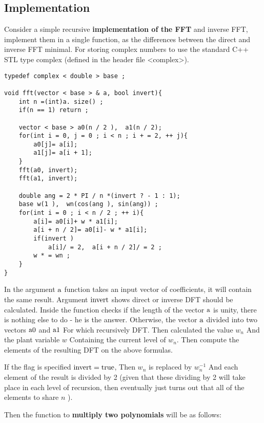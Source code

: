 \subsection{ Implementation }

Consider a simple recursive \textbf{implementation of the FFT} and inverse FFT, implement them in a single function, as the differences between the direct and inverse FFT minimal. For storing complex numbers to use the standard C++ STL type complex (defined in the header file <complex>).

\begin{verbatim}
typedef complex < double > base ;
 
void fft(vector < base > & a, bool invert){
    int n =(int)a. size() ;
    if(n == 1) return ;
 
    vector < base > a0(n / 2 ),  a1(n / 2);
    for(int i = 0, j = 0 ; i < n ; i + = 2, ++ j){
        a0[j]= a[i];
        a1[j]= a[i + 1];
    }
    fft(a0, invert);
    fft(a1, invert);
 
    double ang = 2 * PI / n *(invert ? - 1 : 1);
    base w(1 ),  wn(cos(ang ), sin(ang)) ;
    for(int i = 0 ; i < n / 2 ; ++ i){
        a[i]= a0[i]+ w * a1[i];
        a[i + n / 2]= a0[i]- w * a1[i];
        if(invert )
            a[i]/ = 2,  a[i + n / 2]/ = 2 ;
        w * = wn ;
    }
} 
\end{verbatim}
In the argument $\rm a$ function takes an input vector of coefficients, it will contain the same result. Argument $\rm invert$ shows direct or inverse DFT should be calculated. Inside the function checks if the length of the vector $\rm a$ is unity, there is nothing else to do - he is the answer. Otherwise, the vector $\rm a$ divided into two vectors $\rm a0$ and $\rm a1$ For which recursively DFT. Then calculated the value $w_n$ And the plant variable $w$ Containing the current level of $w_n$. Then compute the elements of the resulting DFT on the above formulas.

If the flag is specified $\rm invert = true$, Then $w_n$ is replaced by $w_n ^ {-1}$ And each element of the result is divided by 2 (given that these dividing by 2 will take place in each level of recursion, then eventually just turns out that all of the elements to share $n$ ).

Then the function to \textbf{multiply two polynomials} will be as follows:

